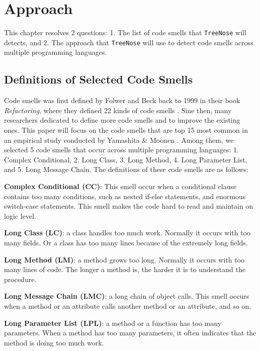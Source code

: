 \section{Approach}
\label{sec:approach}

This chapter resolves 2 questions: 1. The list of code smells that \texttt{TreeNose} will detects, 
and 2. The approach that \texttt{TreeNose} will use to detect code smells across multiple programming languages.


\subsection{Definitions of Selected Code Smells}
\label{sec:Definitions of Selected Code Smells}

Code smells was first defined by Folwer and Beck back to 1999 in their book \textit{Refactoring}, 
where they defined 22 kinds of code smells \cite{Fowler_Beck}. Sine then, many researchers dedicated to define more 
code smells and to improve the existing ones. This paper will focus on the code smells that are top 15 most common in 
an empirical study conducted by Yamashita \& Moonen \cite{6405287}.
Among them, we selected 5 code smells that occur across multiple programming languages: 1. Complex Conditional, 2. Long Class,
3. Long Method, 4. Long Parameter List, and 5. Long Message Chain. The definitions of these code smells are as follows:

\textbf{Complex Conditional (CC)}: This smell occur when a conditional clause contains too many conditions, 
such as nested if-else statements, and enormous switch-case statements. This smell makes the code hard to read and maintain on logic level.

\textbf{Long Class (LC)}: a class handles too much work. Normally it occurs with too many fields. Or a class has too many lines because of 
the extremely long fields. 

\textbf{Long Method (LM)}: a method grows too long. Normally it occurs with too many lines of code. The longer a method is, the harder it is to understand the procedure.

\textbf{Long Message Chain (LMC)}: a long chain of object calls. This smell occurs when a method or an attribute calls another method or an attribute, and so on.

\textbf{Long Parameter List (LPL)}: a method or a function has too many parameters. When a method has too many parameters, it often indicates that the method is doing too much work.

